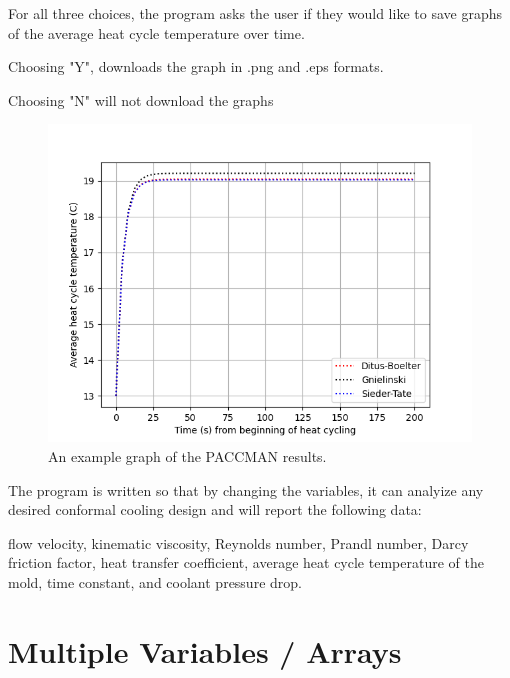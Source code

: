 \documentclass[a4paper,12pt]{article}
\begin{document}
\medskip

For all three choices, the program asks the user if they would like to save graphs of the average heat cycle temperature over time.
\begin{adjustwidth}{1cm}{}
Choosing "Y", downloads the graph in .png and .eps formats.

Choosing "N" will not download the graphs
\end{adjustwidth}

\clearpage

\medskip
\begin{center}
\begin{figure}
\centering
\includegraphics[width=12cm]{paccman-example-graph.png}
\caption{An example graph of the PACCMAN results. }
\end{figure}
\end{center}

The program is written so that by changing the variables, it can analyize any desired conformal cooling design and will report the following data: 
\begin{adjustwidth}{1cm}{}

flow velocity, kinematic viscosity, Reynolds number, Prandl number, Darcy friction factor, heat transfer coefficient, average heat cycle temperature of the mold, time constant, and coolant pressure drop.

\end{adjustwidth}
\clearpage

\section*{Multiple Variables / Arrays}
\end{document}
